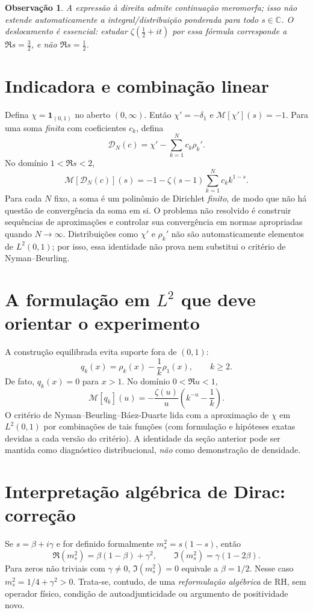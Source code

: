 \documentclass[11pt,a4paper]{article}
\newtheorem{observacao}{Observação}
\begin{document}
\begin{observacao}
A expressão à direita admite continuação \emph{meromorfa}; isso não estende automaticamente a integral/distribuição ponderada para todo $s\in\mathbb C$. O deslocamento é essencial: estudar $\zeta(\tfrac12+it)$ por essa fórmula corresponde a $\Re s=\tfrac32$, e não $\Re s=\tfrac12$.
\end{observacao}

\section{Indicadora e combinação linear}
Defina $\chi=\mathbf 1_{(0,1)}$ no aberto $(0,\infty)$. Então $\chi'=-\delta_1$ e $\mathcal M[\chi'](s)=-1$. Para uma soma \emph{finita} com coeficientes $c_k$, defina
\[
\mathcal D_N(c)=\chi'-\sum_{k=1}^N c_k\rho_k'.
\]
No domínio $1<\Re s<2$,
\[
\boxed{\mathcal M[\mathcal D_N(c)](s)=-1-\zeta(s-1)\sum_{k=1}^N c_k k^{1-s}.}
\]
Para cada $N$ fixo, a soma é um polinômio de Dirichlet \emph{finito}, de modo que não há questão de convergência da soma em si. O problema não resolvido é construir sequências de aproximações e controlar sua convergência em normas apropriadas quando $N\to\infty$. Distribuições como $\chi'$ e $\rho_k'$ não são automaticamente elementos de $L^2(0,1)$; por isso, essa identidade não prova nem substitui o critério de Nyman--Beurling.

\section{A formulação em $L^2$ que deve orientar o experimento}
A construção equilibrada evita suporte fora de $(0,1)$:
\[
q_k(x)=\rho_k(x)-\frac1k\rho_1(x),\qquad k\ge2.
\]
De fato, $q_k(x)=0$ para $x>1$. No domínio $0<\Re u<1$,
\[
\mathcal M[q_k](u)=-\frac{\zeta(u)}{u}\left(k^{-u}-\frac1k\right).
\]
O critério de Nyman--Beurling--Báez-Duarte lida com a aproximação de $\chi$ em $L^2(0,1)$ por combinações de tais funções (com formulação e hipóteses exatas devidas a cada versão do critério). A identidade da seção anterior pode ser mantida como diagnóstico distribucional, \emph{não} como demonstração de densidade.

\section{Interpretação algébrica de Dirac: correção}
Se $s=\beta+i\gamma$ e for definido formalmente $m_s^2=s(1-s)$, então
\[
\Re(m_s^2)=\beta(1-\beta)+\gamma^2,\qquad
\Im(m_s^2)=\gamma(1-2\beta).
\]
Para zeros não triviais com $\gamma\ne0$, $\Im(m_s^2)=0$ equivale a $\beta=1/2$. Nesse caso $m_s^2=1/4+\gamma^2>0$. Trata-se, contudo, de uma \emph{reformulação algébrica} de RH, sem operador físico, condição de autoadjunticidade ou argumento de positividade novo.
\end{document}
